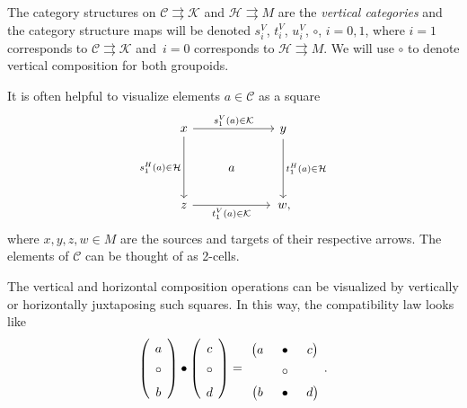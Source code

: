 \documentclass[pdftex]{sigma}
\numberwithin{equation}{section}
\theoremstyle{definition}
\newcommand{\CC}{\mathcal{C}}
\newcommand{\CH}{\mathcal{H}}
\newcommand{\CK}{\mathcal{K}}
\newcommand{\grpd}{\rightrightarrows}
\begin{document}
The category structures on $ \CC \grpd \CK $ and $ \CH \grpd M $ are the \emph{vertical categories} and the category structure maps will be denoted
$s^V_{i}$, $t^V_{i}$, $u^V_i$, $\circ$, $i = 0,1$,
where $ i = 1$ corresponds to $ \CC \grpd \CK $ and~${i= 0}$ corresponds to $ \CH \grpd M$. We will use $ \circ $ to denote vertical composition for both groupoids.

It is often helpful to visualize elements $a \in \CC $ as a square
\[
\begin{tikzcd}
   x \arrow[rr, "s_1^V(a) \in \CK"] \arrow[dd, "s_1^H(a) \in \CH", swap] & & y \arrow[dd, "t_1^H(a) \in \CH"] \\
   & a & \\
   z\arrow[rr, "t_1^V(a) \in \CK", swap] & &\, w,
\end{tikzcd}
\]
where $ x,y,z,w \in M $ are the sources and targets of their respective arrows. The elements of $ \CC $ can be thought of as 2-cells.

The vertical and horizontal composition operations can be visualized by vertically or horizontally juxtaposing such squares. In this way, the compatibility law looks like
\[
\left( \begin{tikzcd}[column sep = tiny, row sep = tiny]
a \\
\circ \\
b
\end{tikzcd} \right)
\bullet
\left(
\begin{tikzcd}[column sep = tiny, row sep = tiny]
c \\
\circ \\
d
\end{tikzcd}\right)
=
\begin{tikzcd} [column sep = tiny, row sep = 0.15em]
\big( a &\bullet & c \big) \\
& \circ  & \\
\big( b & \bullet & d \big)
\end{tikzcd}.
\]
\end{document}
